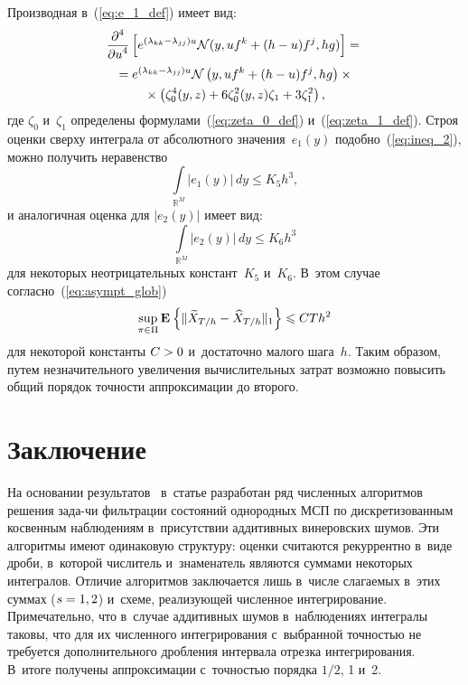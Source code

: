 \begin{multicols}{2}
   Производная в~(\ref{eq:e_1_def}) имеет вид:
   \begin{multline*}
     \displaystyle\frac{\displaystyle \partial^4\mathstrut}{\displaystyle \partial u^4\mathstrut}\left[e^{(\lambda_{kk}-\lambda_{jj})u}
   \mathcal{N}(y,uf^k+(h-u)f^j,hg)\right]={} \\ 
   {}=
   e^{(\lambda_{kk}-\lambda_{jj})u}
   \mathcal{N}\left(y,uf^k+(h-u)f^j,hg\right)\times{}\\
   {}\times\left(\zeta_0^4(y,z)+
   6\zeta_0^2(y,z)\zeta_1 +3\zeta_1^2\right),
      \end{multline*}
      где $\zeta_0$ и~$\zeta_1$ определены формулами~(\ref{eq:zeta_0_def}) 
      и~(\ref{eq:zeta_1_def}).
      Строя оценки сверху интеграла от абсолютного значения~$e_1(y)$ 
      подобно~(\ref{eq:ineq_2}), можно получить неравенство
\begin{equation*}
\int\limits_{\mathbb{R}^M}|e_1(y)|\,dy \leqslant K_5 h^3,
\end{equation*}
и аналогичная оценка для $|e_2(y)|$ имеет вид:
\begin{equation*}
\int\limits_{\mathbb{R}^M}|e_2(y)|\,dy \leqslant K_6 h^3
\end{equation*}
для некоторых неотрицательных констант~$K_5$ и~$K_6$. 
В~этом случае согласно~(\ref{eq:asympt_glob}) 
$$
\mathop{\mathrm{sup}}\limits_{\pi \in \Pi}\mathbf{E}_{  }\left\{ \mathop{\|\widetilde{X}_{T/h}
- \widehat{X}_{T/h}\|_1} \right\} \leqslant CT h^2
$$ 
для некоторой константы $C 
\hm> 0$ и~достаточно малого шага~$h$. Таким образом, путем незначительного 
увеличения вычислительных затрат возможно повысить общий порядок 
точности аппроксимации до второго.

\vspace*{-9pt}

 \section{Заключение}

 На основании результатов~\cite{B_18_IA, B_20_1_IA}
 в~статье
 раз\-работан ряд численных алгоритмов решения зада-\linebreak чи фильтрации 
 состояний однородных МСП по дискретизованным косвенным наблюдениям 
 в~присутствии аддитивных винеровских шумов. Эти алгоритмы имеют 
 одинаковую структуру: оценки считаются рекуррентно в~виде дроби, 
 в~которой чис\-ли\-тель и~знаменатель являются суммами некоторых интегралов. 
 Отличие алгоритмов заключается лишь в~числе сла\-га\-емых в~этих суммах 
 ($s\hm=1, 2$) и~схеме, реализующей численное интегрирование. 
 Примечательно, что в~случае аддитивных шумов в~наблюдениях 
 интегралы таковы, что для их чис\-лен\-но\-го интегрирования с~выбранной 
 точностью не требуется дополнительного дроб\-ле\-ния интервала отрезка 
 интегрирования. В~итоге получены аппроксимации с~точ\-ностью порядка 
 ${1}/{2}$, 1 и~2.
 

\end{multicols}
